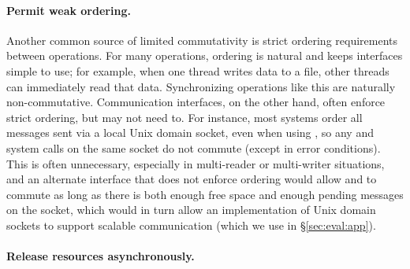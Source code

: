 \paragraph{Permit weak ordering.} \cbend

Another common source of limited commutativity is strict ordering
requirements between operations.  For many operations, ordering is
natural and keeps interfaces simple to use; for example, when one thread
writes data to a file, other threads can immediately read that data.
%
Synchronizing operations like this are naturally non-commutative.
%
Communication interfaces, on the other hand, often enforce strict
ordering, but may not need to.
For instance, most systems order all messages sent via a local Unix
domain socket, even when using
, so any  and  system
calls on the same socket do not commute (except in error conditions).
This is often unnecessary, especially in multi-reader or multi-writer
situations, and an alternate interface that does not enforce ordering
would allow  and  to commute as long as there is
both enough free space and enough pending messages on the socket, which
would in turn allow an implementation of Unix domain sockets to support
scalable communication (which we use in \S\ref{sec:eval:app}).


\cbstart \paragraph{Release resources asynchronously.}


